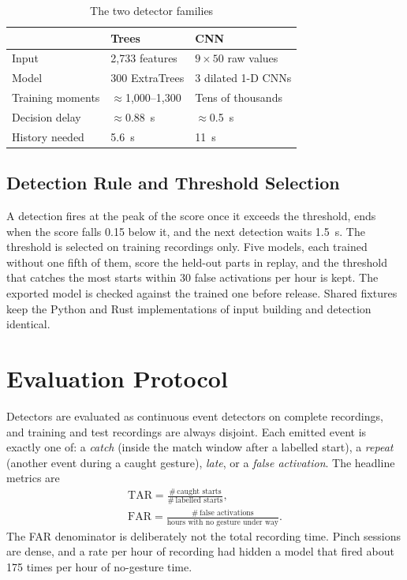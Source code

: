 \begin{table}[t]
  \centering
  \caption{The two detector families}
  \label{tab:models}
  \small
  \begin{tabular}{@{}lll@{}}
    \toprule
     & Trees & CNN \\
    \midrule
    Input & 2{,}733 features & $9 \times 50$ raw values \\
    Model & 300 ExtraTrees & 3 dilated 1-D CNNs \\
    Training moments & $\approx$1{,}000--1{,}300 & Tens of thousands \\
    Decision delay & $\approx$0.88~s & $\approx$0.5~s \\
    History needed & 5.6~s & 11~s \\
    \bottomrule
  \end{tabular}
\end{table}

\subsection{Detection Rule and Threshold Selection}

A detection fires at the peak of the score once it exceeds the threshold, ends when the score falls 0.15 below it, and the next detection waits 1.5~s. The threshold is selected on training recordings only. Five models, each trained without one fifth of them, score the held-out parts in replay, and the threshold that catches the most starts within 30 false activations per hour is kept. The exported model is checked against the trained one before release. Shared fixtures keep the Python and Rust implementations of input building and detection identical.

\section{Evaluation Protocol}\label{sec:protocol}

Detectors are evaluated as continuous event detectors on complete recordings, and training and test recordings are always disjoint. Each emitted event is exactly one of: a \emph{catch} (inside the match window after a labelled start), a \emph{repeat} (another event during a caught gesture), \emph{late}, or a \emph{false activation}. The headline metrics are
\begin{gather}
  \mathrm{TAR} = \frac{\#\,\text{caught starts}}{\#\,\text{labelled starts}}, \label{eq:tar}\\
  \mathrm{FAR} = \frac{\#\,\text{false activations}}{\text{hours with no gesture under way}}. \label{eq:far}
\end{gather}
The FAR denominator is deliberately not the total recording time. Pinch sessions are dense, and a rate per hour of recording had hidden a model that fired about 175 times per hour of no-gesture time.

